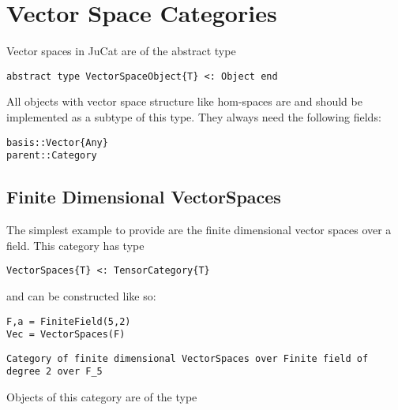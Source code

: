 \documentclass{memoir}
\begin{document}
\section{Vector Space Categories}



Vector spaces in JuCat are of the abstract type




\begin{lstlisting}
abstract type VectorSpaceObject{T} <: Object end
\end{lstlisting}



All objects with vector space structure like hom-spaces are and should be implemented as a subtype of this type. They always need the following fields:




\begin{lstlisting}
basis::Vector{Any}
parent::Category
\end{lstlisting}



\hypertarget{13722891214419362258}{}


\subsection{Finite Dimensional VectorSpaces}



The simplest example to provide are the finite dimensional vector spaces over a field. This category has type




\begin{lstlisting}
VectorSpaces{T} <: TensorCategory{T}
\end{lstlisting}



and can be constructed like so:




\begin{verbatim}
F,a = FiniteField(5,2)
Vec = VectorSpaces(F)
\end{verbatim}


\begin{lstlisting}
Category of finite dimensional VectorSpaces over Finite field of degree 2 over F_5
\end{lstlisting}



Objects of this category are of the type
\end{document}

